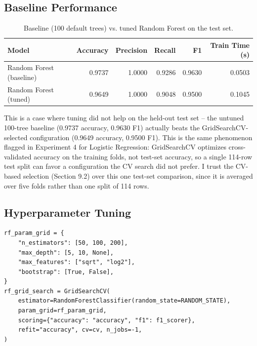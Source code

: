 \documentclass[11pt,a4paper]{article}
\begin{document}
\subsection{Baseline Performance}
\begin{table}[h]
\centering
\begin{tabular}{@{}lrrrrr@{}}
\toprule
Model & Accuracy & Precision & Recall & F1 & Train Time (s) \\
\midrule
Random Forest (baseline) & 0.9737 & 1.0000 & 0.9286 & 0.9630 & 0.0503 \\
Random Forest (tuned) & 0.9649 & 1.0000 & 0.9048 & 0.9500 & 0.1045 \\
\bottomrule
\end{tabular}
\caption{Baseline (100 default trees) vs. tuned Random Forest on the test set.}
\end{table}
This is a case where tuning did not help on the held-out test set -- the untuned 100-tree baseline (0.9737 accuracy, 0.9630 F1) actually beats the GridSearchCV-selected configuration (0.9649 accuracy, 0.9500 F1). This is the same phenomenon flagged in Experiment 4 for Logistic Regression: GridSearchCV optimizes cross-validated accuracy on the training folds, not test-set accuracy, so a single 114-row test split can favor a configuration the CV search did not prefer. I trust the CV-based selection (Section 9.2) over this one test-set comparison, since it is averaged over five folds rather than one split of 114 rows.

\subsection{Hyperparameter Tuning}
\begin{lstlisting}
rf_param_grid = {
    "n_estimators": [50, 100, 200],
    "max_depth": [5, 10, None],
    "max_features": ["sqrt", "log2"],
    "bootstrap": [True, False],
}
rf_grid_search = GridSearchCV(
    estimator=RandomForestClassifier(random_state=RANDOM_STATE),
    param_grid=rf_param_grid,
    scoring={"accuracy": "accuracy", "f1": f1_scorer},
    refit="accuracy", cv=cv, n_jobs=-1,
)
\end{lstlisting}
\end{document}
